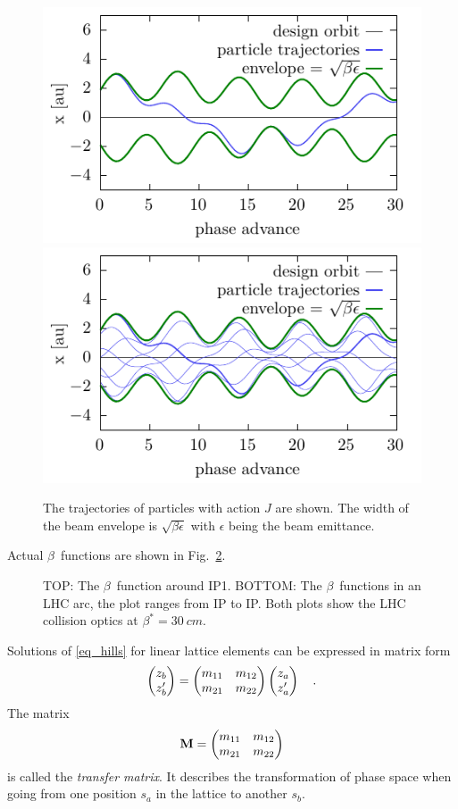 \begin{figure}[h]
    \centering
    \includegraphics[width=.49\linewidth]{particle_traj_beta_1}
    \hfill
    \includegraphics[width=.49\linewidth]{particle_traj_beta_many_wb} 
    \caption{The trajectories of particles with action $J$ are shown. The width of the beam envelope is $\sqrt{\beta\epsilon}$ with $\epsilon$ being the beam emittance. }
    \label{fig_part_traj}
\end{figure}
%
Actual $\beta$~functions are shown in Fig.~\ref{fig_beta}.
%
\begin{figure}[h]
  \centering
  \footnotesize
  
  
  \normalsize
  \caption{
    TOP: The $\beta$~function around IP1.
    BOTTOM: The $\beta$~functions in an LHC arc, the plot ranges from IP to IP.
    Both plots show the LHC collision optics at $\beta^*=\SI{30}{cm}$.
  }
  \label{fig_beta}
\end{figure}

Solutions of \eqref{eq_hills} for linear lattice elements can be expressed in matrix form
%
\begin{equation}
    \begin{pmatrix}
        z_b\\
        z_b'
    \end{pmatrix}
    =
    \begin{pmatrix}
        m_{11} & m_{12} \\
        m_{21} & m_{22}
    \end{pmatrix}
    \begin{pmatrix}
        z_a\\
        z_a'
    \end{pmatrix}
    \quad .
    \label{eq_matrix_element}
\end{equation}
%
The matrix 
%
\begin{equation}
    \mathbf{M} = 
    \begin{pmatrix}
        m_{11} & m_{12} \\
        m_{21} & m_{22}
    \end{pmatrix}
    \label{eq_trmat}
\end{equation}
%
is called the \emph{transfer matrix}. It describes the transformation
of phase space when going from one position $s_a$ in the lattice to another $s_b$.

